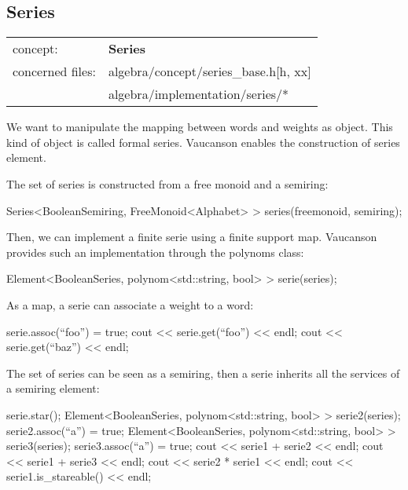 \documentclass{article}
\begin{document}
\subsection{Series}

\begin{tabular}%
{ll}
\hline 
concept: & \textbf{Series}  \\
concerned files: & algebra/concept/series\_base.h[h, xx] \\
                 & algebra/implementation/series/* \\
\hline 
\end{tabular}

We want to manipulate the mapping between words and weights as object.
This kind of object is called formal series. Vaucanson enables the
construction of series element. 

The set of series is constructed from a free monoid and a semiring:

\begin{code}
Series<BooleanSemiring, FreeMonoid<Alphabet> > series(freemonoid, semiring); 
\end{code}

Then, we can implement a finite serie using a finite support map.
Vaucanson provides such an implementation through the polynoms class:

\begin{code}[A serie]
Element<BooleanSeries, polynom<std::string, bool> > serie(series);
\end{code}

As a map, a serie can associate a weight to a word:

\begin{code}
serie.assoc(``foo'') = true;
cout << serie.get(``foo'') << endl;
cout << serie.get(``baz'') << endl;
\end{code}

The set of series can be seen as a semiring, then a serie inherits all
the services of a semiring element:

\begin{code}
serie.star();
Element<BooleanSeries, polynom<std::string, bool> > serie2(series);
serie2.assoc(``a'') = true;
Element<BooleanSeries, polynom<std::string, bool> > serie3(series);
serie3.assoc(``a'') = true;
cout << serie1 + serie2 << endl;
cout << serie1 + serie3 << endl;
cout << serie2 * serie1 << endl;
cout << serie1.is_stareable() << endl;
\end{code}
\end{document}
